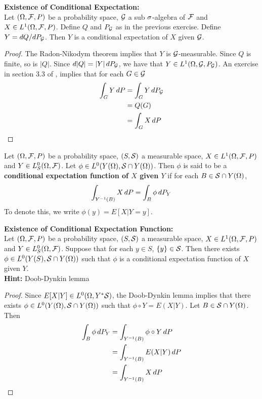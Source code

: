 \documentclass{book}
\begin{document}
	\begin{ex}\textbf{Existence of Conditional Expectation:}\\
	Let $(\Omega, \mathcal{F}, P)$ be a probability space, $\mathcal{G}$ a sub $\sigma$-algebra of $\mathcal{F}$ and $X \in L^1(\Omega, \mathcal{F}, P)$. Define $Q$ and $P_{\mathcal{G}}$ as in the previous exercise. Define $Y = dQ/dP_{\mathcal{G}}$. Then $Y$ is a conditional expectation of $X$ given $\mathcal{G}$.
	\end{ex}
	
	\begin{proof}
		The Radon-Nikodym theorem implies that $Y$ is $\mathcal{G}$-measurable. Since $Q$ is finite, so is $|Q|$. Since $d|Q| = |Y|\, d P_{\mathcal{G}}$, we have that $Y \in L^1(\Omega, \mathcal{G}, P_{\mathcal{G}})$. An exercise in section $3.3$ of \cite{measure}, implies that for each $G \in \mathcal{G}$ 
		\begin{align*}
		\int_G Y \, d P 
		&= \int_G Y \, d P_{\mathcal{G}} \\
		&= Q(G) \\
		&= \int_G X \, d P
\end{align*}					
	\end{proof}	
	
	\begin{defn}
	Let $(\Omega, \mathcal{F}, P)$ be a probability space, $(S, \mathcal{S})$ a measurable space, $X \in L^1(\Omega, \mathcal{F}, P)$ and $Y \in L^0_S(\Omega, \mathcal{F})$. Let $\phi \in L^0(Y(\Omega), \mathcal{S} \cap Y(\Omega))$. Then $\phi$ is said to be a \textbf{conditional expectation function of $X$ given $Y$} if for each $B \in \mathcal{S} \cap Y(\Omega)$, $$\int_{Y^{-1}(B)} X \, d P = \int_{B} \phi \, d P_Y$$
	To denote this, we write $\phi(y) = E[X|Y = y]$.
	\end{defn}
	
	
	
	\begin{ex} \textbf{Existence of Conditional Expectation Function:} \\
	Let $(\Omega, \mathcal{F}, P)$ be a probability space, $(S, \mathcal{S})$ a measurable space, $X \in L^1(\Omega, \mathcal{F}, P)$ and $Y \in L^0_S(\Omega, \mathcal{F})$. Suppose that for each $y \in S$, $\{y\} \in \mathcal{S}$. Then there exists $\phi \in L^0(Y(S), \mathcal{S} \cap Y(\Omega))$ such that $\phi$ is a conditional expectation function of $X$ given $Y$.\\
	\textbf{Hint:} Doob-Dynkin lemma
	\end{ex}	
	
	\begin{proof}
	Since $E[X| Y] \in L^0(\Omega, Y^*\mathcal{S})$, the Doob-Dynkin lemma implies that there exists $\phi \in L^0(Y(\Omega), \mathcal{S} \cap Y(\Omega))$ such that $\phi \circ Y = E(X|Y)$. Let $B \in \mathcal{S} \cap Y(\Omega)$. Then 
	\begin{align*}
	\int_B \phi \, d P_Y
	&= \int_{Y^{-1}(B)} \phi \circ Y \, d P \\
	&= \int_{Y^{-1}(B)} E(X|Y) \, d P \\
	&= \int_{Y^{-1}(B)} X \, d P \\
	\end{align*}
	\end{proof}
	
\end{document}
